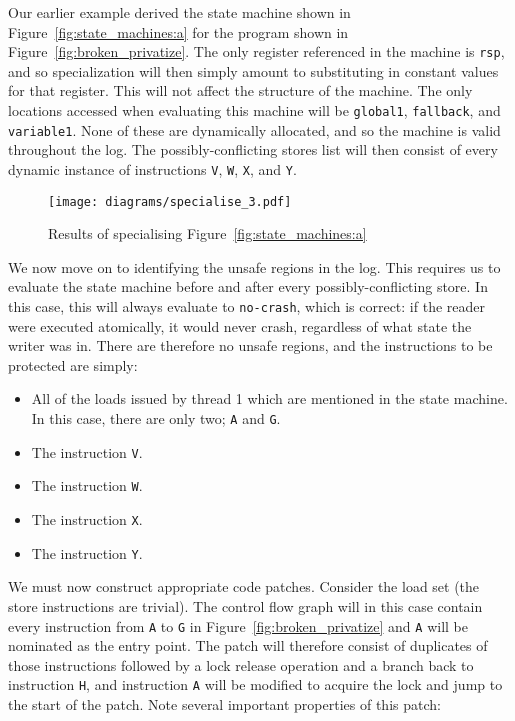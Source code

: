 \documentclass[10pt,letter,twocolumn]{sigplanconf}
\begin{document}
Our earlier example derived the state machine shown in
Figure~\ref{fig:state_machines:a} for the program shown in
Figure~\ref{fig:broken_privatize}.  The only register referenced in
the machine is \verb|rsp|, and so specialization will then simply
amount to substituting in constant values for that register.  This
will not affect the structure of the machine.  The only locations
accessed when evaluating this machine will be \verb|global1|,
\verb|fallback|, and \verb|variable1|.  None of these are dynamically
allocated, and so the machine is valid throughout the log.  The
possibly-conflicting stores list will then consist of every dynamic
instance of instructions \verb|V|, \verb|W|, \verb|X|, and \verb|Y|.

\begin{figure}[thb]
\texttt{[image: diagrams/specialise\_3.pdf]}
\caption{Results of specialising Figure~\ref{fig:state_machines:a}}
\label{fig:specialised_example_machine}
\end{figure}

We now move on to identifying the unsafe regions in the log.  This
requires us to evaluate the state machine before and after every
possibly-conflicting store.  In this case, this will always evaluate
to \verb|no-crash|, which is correct: if the reader were executed
atomically, it would never crash, regardless of what state the writer
was in.  There are therefore no unsafe regions, and the instructions
to be protected are simply:

\begin{itemize}
\item All of the loads issued by thread 1 which are mentioned in the
  state machine.  In this case, there are only two; \verb|A| and
  \verb|G|.
\item The instruction \verb|V|.
\item The instruction \verb|W|.
\item The instruction \verb|X|.
\item The instruction \verb|Y|.
\end{itemize}

We must now construct appropriate code patches.  Consider the load set
(the store instructions are trivial).  The control flow graph will in
this case contain every instruction from \verb|A| to \verb|G| in
Figure~\ref{fig:broken_privatize} and \verb|A| will be nominated as
the entry point.  The patch will therefore consist of duplicates of
those instructions followed by a lock release operation and a branch
back to instruction \verb|H|, and instruction \verb|A| will be
modified to acquire the lock and jump to the start of the patch.  Note
several important properties of this patch:
\end{document}
